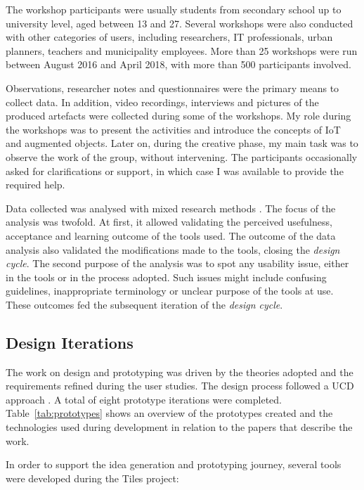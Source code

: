 The workshop participants were usually students from secondary school up to university level, aged between 13 and 27. Several workshops were also conducted with other categories of users, including researchers, IT professionals, urban planners, teachers and municipality employees. More than 25 workshops were run between August 2016 and April 2018, with more than 500 participants involved.

Observations, researcher notes and questionnaires were the primary means to collect data. In addition, video recordings, interviews and pictures of the produced artefacts were collected during some of the workshops. My role during the workshops was to present the activities and introduce the concepts of IoT and augmented objects. Later on, during the creative phase, my main task was to observe the work of the group, without intervening. The participants occasionally asked for clarifications or support, in which case I was available to provide the required help.

Data collected was analysed with mixed research methods \autocite{venkatesh_bridging_2013}. The focus of the analysis was twofold. At first, it allowed validating the perceived usefulness, acceptance and learning outcome of the tools used. The outcome of the data analysis also validated the modifications made to the tools, closing the \emph{design cycle}.
The second purpose of the analysis was to spot any usability issue, either in the tools or in the process adopted. Such issues might include confusing guidelines, inappropriate terminology or unclear purpose of the tools at use. These outcomes fed the subsequent iteration of the \emph{design cycle}.

\subsection{Design Iterations}
\label{sec:prototypes}

The work on design and prototyping was driven by the theories adopted and the requirements refined during the user studies. The design process followed a UCD approach \autocites{maguire_methods_2001}{gulliksen_key_2003}. A total of eight prototype iterations were completed. Table~\ref{tab:prototypes} shows an overview of the prototypes created and the technologies used during development in relation to the papers that describe the work.

In order to support the idea generation and prototyping journey, several tools were developed during the Tiles project:

